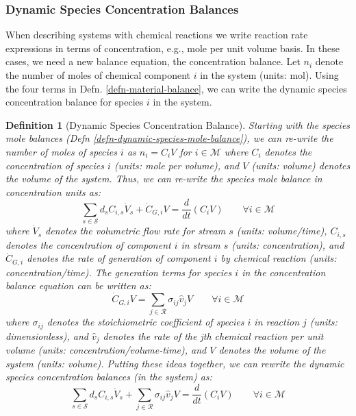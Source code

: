 \documentclass{article}[11pt]
\newtheorem{defn}{Definition}
\begin{document}
\subsubsection*{Dynamic Species Concentration Balances}
When describing systems with chemical reactions we write reaction rate expressions in terms of 
concentration, e.g., mole per unit volume basis.
In these cases, we need a new balance equation, the concentration balance. 
Let $n_{i}$ denote the number of moles of chemical component $i$ in the system (units: mol). 
Using the four terms in Defn. \ref{defn-material-balance}, we can write the dynamic species concentration balance for species $i$ in the system.

\begin{mdframed}
\begin{defn}[Dynamic Species Concentration Balance]\label{defn-dynamic-species-concentration-balance}
Starting with the species mole balances (Defn \ref{defn-dynamic-species-mole-balance}), we can re-write the number of moles of species $i$ as $n_{i} = C_{i}V$ for ${i}\in\mathcal{M}$
where $C_{i}$ denotes the concentration of species $i$ (units: mole per volume), and $V$ (units: volume) denotes the volume of the system. 
Thus, we can re-write the species mole balance in concentration units as:
\begin{equation}\label{eqn:concentration-balance}
\sum_{s\in\mathcal{S}}d_{s}C_{i,s}\dot{V}_{s} + \dot{C}_{G,i}V = \frac{d}{dt}\left(C_{i}V\right)\qquad\forall{i}\in\mathcal{M}
\end{equation}
where $\dot{V}_{s}$ denotes the volumetric flow rate for stream $s$ (units: volume/time), 
$C_{i,s}$ denotes the concentration of component $i$ in stream $s$ (units: concentration), 
and $\dot{C}_{G,i}$ denotes the rate of generation of component $i$ by chemical reaction (units: concentration/time).
The generation terms for species $i$ in the concentration balance equation can be written as:
\begin{equation}\label{eqn:concentration-gen-terms}
\dot{C}_{G,i}V = \sum_{j\in\mathcal{R}}\sigma_{ij}\hat{v}_{j}V\qquad\forall{i}\in\mathcal{M}
\end{equation}
where $\sigma_{ij}$ denotes the stoichiometric coefficient of species $i$ in reaction $j$ (units: dimensionless), 
and $\hat{v}_{j}$ denotes the rate of the jth chemical reaction per unit volume (units: concentration/volume-time), 
and $V$ denotes the volume of the system (units: volume).
Putting these ideas together, we can rewrite the dynamic species concentration balances (in the system) as:
\begin{equation}\label{eqn:concentration-balance-with-extent}
\sum_{s\in\mathcal{S}}d_{s}C_{i,s}\dot{V}_{s} + \sum_{j\in\mathcal{R}}\sigma_{ij}\hat{v}_{j}V = \frac{d}{dt}\left(C_{i}V\right)\qquad\forall{i\in\mathcal{M}}
\end{equation}
\end{defn}
\end{mdframed}
\end{document}
